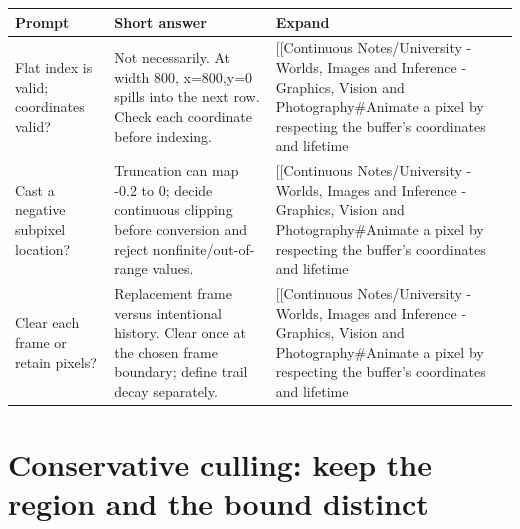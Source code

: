 {\def\LTcaptype{none} %
\begin{longtable}[]{@{}
  >{\raggedright\arraybackslash}p{}
  >{\raggedright\arraybackslash}p{}
  >{\raggedright\arraybackslash}p{}@{}}
\toprule\noalign{}
\begin{minipage}[b]{\linewidth}\raggedright
Prompt
\end{minipage} & \begin{minipage}[b]{\linewidth}\raggedright
Short answer
\end{minipage} & \begin{minipage}[b]{\linewidth}\raggedright
Expand
\end{minipage} \\
\midrule\noalign{}
\endhead
\bottomrule\noalign{}
\endlastfoot
Flat index is valid; coordinates valid? & Not necessarily. At width 800, x=800,y=0 spills into the next row. Check each coordinate before indexing. & {[}{[}Continuous Notes/University - Worlds, Images and Inference - Graphics, Vision and Photography\#Animate a pixel by respecting the buffer's coordinates and lifetime \\
Cast a negative subpixel location? & Truncation can map -0.2 to 0; decide continuous clipping before conversion and reject nonfinite/out-of-range values. & {[}{[}Continuous Notes/University - Worlds, Images and Inference - Graphics, Vision and Photography\#Animate a pixel by respecting the buffer's coordinates and lifetime \\
Clear each frame or retain pixels? & Replacement frame versus intentional history. Clear once at the chosen frame boundary; define trail decay separately. & {[}{[}Continuous Notes/University - Worlds, Images and Inference - Graphics, Vision and Photography\#Animate a pixel by respecting the buffer's coordinates and lifetime \\
\end{longtable}
}

\section{Conservative culling: keep the region and the bound distinct}\label{appendix-a8f634b076b5-conservative-culling-keep-the-region-and-the-bound-distinct}

